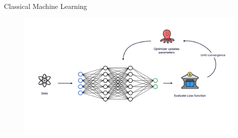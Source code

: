 \documentclass[aspectratio=169, 8pt, xcolor={svgnames}, hyperref={linkcolor=black}]{beamer}
\begin{document}
\begin{frame}{Classical Machine Learning}
\begin{figure}
   \includegraphics[width=1\linewidth]{figures/ml_scheme.png}
\end{figure}  
\end{frame}
\end{document}
